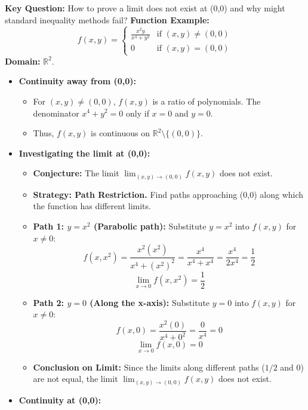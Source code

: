 \hfill

\begin{cascade}
	\textbf{Key Question:} How to prove a limit does not exist at (0,0) and why might standard inequality methods fail?
	\textbf{Function Example:}
	\[ f(x, y) = \begin{cases} \frac{x^2 y}{x^4 + y^2} & \text{if } (x, y) \neq (0, 0) \\ 0 & \text{if } (x, y) = (0, 0) \end{cases} \]
	\textbf{Domain:} $\mathbb{R}^2$.
	\begin{itemize}
		\item \textbf{Continuity away from (0,0):}
		      \begin{itemize}
			      \item For $(x, y) \neq (0, 0)$, $f(x, y)$ is a ratio of polynomials. The denominator $x^4 + y^2 = 0$ only if $x=0$ and $y=0$.
			      \item Thus, $f(x, y)$ is continuous on $\mathbb{R}^2 \setminus \{(0, 0)\}$.
		      \end{itemize}
		\item \textbf{Investigating the limit at (0,0):}
		      \begin{itemize}
			      \item \textbf{Conjecture:} The limit $\lim_{(x,y) \to (0,0)} f(x, y)$ does not exist.
			      \item \textbf{Strategy: Path Restriction.} Find paths approaching (0,0) along which the function has different limits.
			      \item \textbf{Path 1: $y = x^2$ (Parabolic path):} Substitute $y=x^2$ into $f(x,y)$ for $x \neq 0$:
			            \[ f(x, x^2) = \frac{x^2 (x^2)}{x^4 + (x^2)^2} = \frac{x^4}{x^4 + x^4} = \frac{x^4}{2x^4} = \frac{1}{2} \]
			            \[ \lim_{x \to 0} f(x, x^2) = \frac{1}{2} \]
			      \item \textbf{Path 2: $y = 0$ (Along the x-axis):} Substitute $y=0$ into $f(x,y)$ for $x \neq 0$:
			            \[ f(x, 0) = \frac{x^2 (0)}{x^4 + 0^2} = \frac{0}{x^4} = 0 \]
			            \[ \lim_{x \to 0} f(x, 0) = 0 \]
			      \item \textbf{Conclusion on Limit:} Since the limits along different paths ($1/2$ and $0$) are not equal, the limit $\lim_{(x,y) \to (0,0)} f(x, y)$ does not exist.
		      \end{itemize}
		\item \textbf{Continuity at (0,0):}
		      \begin{itemize}

\end{itemize}
\end{itemize}
\end{cascade}
